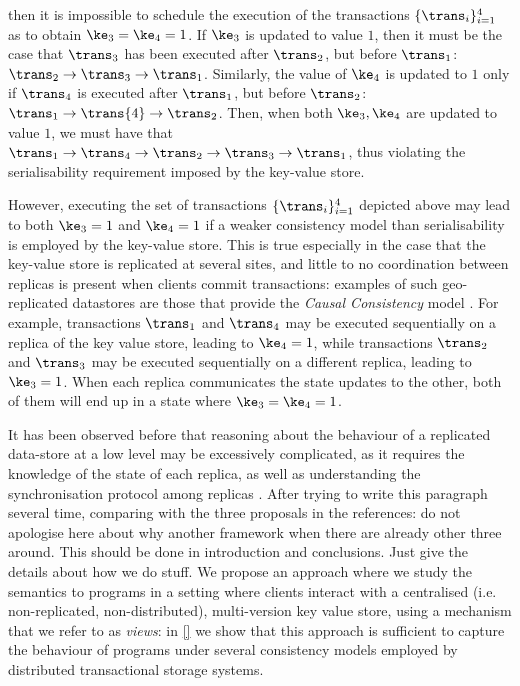 then it is impossible to schedule the execution of the transactions $\{\trans_{i}\}_{i=1}^{4}$ 
as to obtain $\ke_3 = \ke_4 = 1$. 
If $\ke_3$ is updated to value $1$, then it must be the case that 
$\trans_3$ has been executed after  $\trans_2$, but before $\trans_1$: 
$\trans_2 \rightarrow \trans_{3} \rightarrow \trans_1$.
Similarly, the value of $\ke_4$ is updated 
to $1$ only if $\trans_4$ 
is executed after $\trans_1$, 
but before $\trans_2$: $\trans_{1} \rightarrow \trans{4} \rightarrow \trans_{2}$. 
Then, when both $\ke_3, \ke_4$ are updated to value $1$, we must have that 
$\trans_1 \rightarrow \trans_4 \rightarrow \trans_2 \rightarrow \trans_3 
\rightarrow \trans_1$, thus violating the serialisability requirement imposed by 
the key-value store. 

However, executing the set of transactions $\{\trans_{i}\}_{i=1}^{4}$ depicted above 
may lead to both $\ke_3 = 1$ and $\ke_4 = 1$ if a weaker consistency model than 
serialisability is employed by the key-value store. This is true especially in the case 
that the key-value store is replicated at several sites, and little to no coordination 
between replicas is present when clients commit transactions: examples of such geo-replicated 
datastores are those that provide the \emph{Causal Consistency} model \cite{cops}. 
For example, transactions $\trans_1$ and $\trans_4$ may be executed sequentially 
on a replica of the key value store, leading to $\ke_4 = 1$, while transactions 
$\trans_2$ and $\trans_3$ may be executed sequentially on a different replica, leading to $\ke_3 = 1$. 
When each replica communicates the state updates to the other, both of them will 
end up in a state where $\ke_3 = \ke_4 = 1$. 

It has been observed before that reasoning about the behaviour of a replicated data-store at a low level 
may be excessively complicated, as it requires the knowledge of the state of each 
replica, as well as understanding the synchronisation protocol among replicas \cite{framework-concur,adya,seebelieve}. 
\ac{After trying to write this paragraph several time, comparing with the three proposals in the references: 
do not apologise here about why another framework when there are already other three around. This should 
be done in introduction and conclusions. Just give the details about how we do stuff.} 
We propose an approach where we study the semantics to programs in a setting where 
clients interact with a centralised (i.e. non-replicated, non-distributed), multi-version key value store, 
using a mechanism that we refer to as \emph{views}: in \cref{} we show that this approach 
is sufficient to capture the behaviour of programs under several consistency models 
employed by distributed transactional storage systems.

